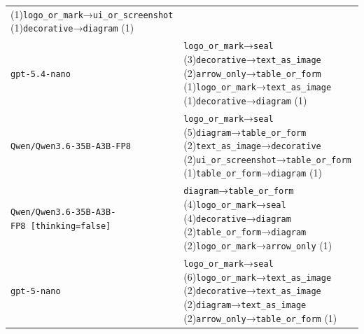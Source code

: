 \documentclass[
]{article}
\begin{document}
{\begin{longtable}[]{@{}
  >{\raggedright\arraybackslash}p{}
  >{\raggedright\arraybackslash}p{}@{}}
(1)\texttt{logo\_or\_mark}→\texttt{ui\_or\_screenshot}
(1)\texttt{decorative}→\texttt{diagram} (1) \\
\texttt{gpt-5.4-nano} & \texttt{logo\_or\_mark}→\texttt{seal}
(3)\texttt{decorative}→\texttt{text\_as\_image}
(2)\texttt{arrow\_only}→\texttt{table\_or\_form}
(1)\texttt{logo\_or\_mark}→\texttt{text\_as\_image}
(1)\texttt{decorative}→\texttt{diagram} (1) \\
\texttt{Qwen/Qwen3.6-35B-A3B-FP8} &
\texttt{logo\_or\_mark}→\texttt{seal}
(5)\texttt{diagram}→\texttt{table\_or\_form}
(2)\texttt{text\_as\_image}→\texttt{decorative}
(2)\texttt{ui\_or\_screenshot}→\texttt{table\_or\_form}
(1)\texttt{table\_or\_form}→\texttt{diagram} (1) \\
\texttt{Qwen/Qwen3.6-35B-A3B-FP8\ {[}thinking=false{]}} &
\texttt{diagram}→\texttt{table\_or\_form}
(4)\texttt{logo\_or\_mark}→\texttt{seal}
(4)\texttt{decorative}→\texttt{diagram}
(2)\texttt{table\_or\_form}→\texttt{diagram}
(2)\texttt{logo\_or\_mark}→\texttt{arrow\_only} (1) \\
\texttt{gpt-5-nano} & \texttt{logo\_or\_mark}→\texttt{seal}
(6)\texttt{logo\_or\_mark}→\texttt{text\_as\_image}
(2)\texttt{decorative}→\texttt{text\_as\_image}
(2)\texttt{diagram}→\texttt{text\_as\_image}
(2)\texttt{arrow\_only}→\texttt{table\_or\_form} (1) \\
\end{longtable}
}
\end{document}
